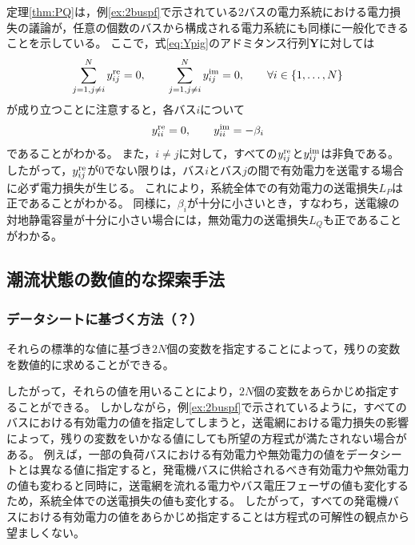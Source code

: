 \documentclass[tombow,dvipdfmx]{corona-a5}
\begin{document}
定理\ref{thm:PQ}は，例\ref{ex:2buspf}で示されている2バスの電力系統における電力損失の議論が，任意の個数のバスから構成される電力系統にも同様に一般化できることを示している。
ここで，式\ref{eq:Ypig}のアドミタンス行列$\bm{Y}$に対しては
\begin{align*}
\sum_{j=1,j\neq i}^N  y^{\rm re}_{ij} =0
,\qquad
\sum_{j=1,j\neq i}^N  y^{\rm im}_{ij} =0
,\qquad
\forall i \in \{1,\ldots,N\}
\end{align*}
が成り立つことに注意すると，各バス$i$について
\begin{align*}
y^{\rm re}_{ii}=0,\qquad
y^{\rm im}_{ii}= - \beta_i
\end{align*}
であることがわかる。
また，$i\neq j$に対して，すべての$y^{\rm re}_{ij} $と$y^{\rm im}_{ij}$は非負である。
したがって，$y^{\rm re}_{ij}$が0でない限りは，バス$i$とバス$j$の間で有効電力を送電する場合に必ず電力損失が生じる。
これにより，系統全体での有効電力の送電損失$L_P$は正であることがわかる。
同様に，$\beta_i$が十分に小さいとき，すなわち，送電線の対地静電容量が十分に小さい場合には，無効電力の送電損失$L_Q$も正であることがわかる。


\subsection{潮流状態の数値的な探索手法}

\subsubsection{データシートに基づく方法（？）}

それらの標準的な値に基づき$2N$個の変数を指定することによって，残りの変数を数値的に求めることができる。

したがって，それらの値を用いることにより，$2N$個の変数をあらかじめ指定することができる。
しかしながら，例\ref{ex:2buspf}で示されているように，すべてのバスにおける有効電力の値を指定してしまうと，送電網における電力損失の影響によって，残りの変数をいかなる値にしても所望の方程式が満たされない場合がある。
例えば，一部の負荷バスにおける有効電力や無効電力の値をデータシートとは異なる値に指定すると，発電機バスに供給されるべき有効電力や無効電力の値も変わると同時に，送電網を流れる電力やバス電圧フェーザの値も変化するため，系統全体での送電損失の値も変化する。
したがって，すべての発電機バスにおける有効電力の値をあらかじめ指定することは方程式の可解性の観点から望ましくない。
\end{document}
